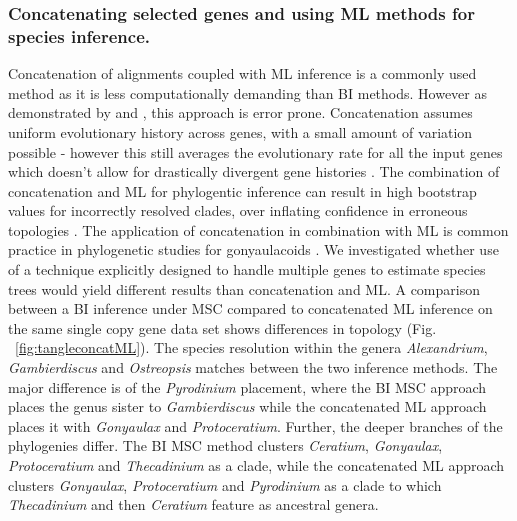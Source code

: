\documentclass[fleqn,10pt,lineno]{wlpeerj} %
\begin{document}
\subsubsection*{Concatenating selected genes and using ML methods for species inference.}
Concatenation of alignments coupled with ML inference is a commonly used method as it is less computationally demanding than BI methods. 
However as demonstrated by \cite{kubatko2007inconsistency} and \cite{roch2015likelihood}, this approach is error prone. 
Concatenation assumes uniform evolutionary history across genes, with a small amount of variation possible - however this still averages the evolutionary rate for all the input genes which doesn't allow for drastically divergent gene histories \citep{roch2015likelihood}. 
The combination of concatenation and ML for phylogentic inference can result in high bootstrap values for incorrectly resolved clades, over inflating confidence in erroneous topologies \citep{degnan2009gene}. 
The application of concatenation in combination with ML is common practice in phylogenetic studies for gonyaulacoids  \citep{shalchian2006combined,zhang2007three,saldarriaga2004molecular,murray2005improving,hoppenrath2010dinoflagellate}.
We investigated whether use of a technique explicitly designed to handle multiple genes to estimate species trees would yield different results than concatenation and ML. 
A comparison between a BI inference under MSC compared to concatenated ML inference on the same single copy gene data set shows differences in topology (Fig. ~\ref{fig:tangleconcatML}). 
The species resolution within the genera \emph{Alexandrium}, \emph{Gambierdiscus} and \emph{Ostreopsis} matches between the two inference methods. 
The major difference is of the \emph{Pyrodinium} placement, where the BI MSC approach places the genus sister to \emph{Gambierdiscus} while the concatenated ML approach places it with \emph{Gonyaulax} and \emph{Protoceratium}. 
Further, the deeper branches of the phylogenies differ. 
The BI MSC method clusters \emph{Ceratium}, \emph{Gonyaulax}, \emph{Protoceratium} and \emph{Thecadinium} as a clade, while the concatenated ML approach clusters \emph{Gonyaulax}, \emph{Protoceratium} and \emph{Pyrodinium} as a clade to which \emph{Thecadinium} and then \emph{Ceratium} feature as ancestral genera. 
\end{document}
